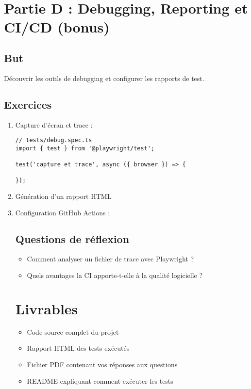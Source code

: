 \documentclass[a4paper,12pt]{article}
\begin{document}
\newpage
\section*{Partie D : Debugging, Reporting et CI/CD (bonus)}
\subsection*{But}
Découvrir les outils de debugging et configurer les rapports de test.

\subsection*{Exercices}
\begin{enumerate}
\item Capture d’écran et trace :
\begin{lstlisting}
// tests/debug.spec.ts
import { test } from '@playwright/test';

test('capture et trace', async ({ browser }) => {
  
});
\end{lstlisting}

\item Génération d’un rapport HTML

\item Configuration GitHub Actions :

\subsection*{Questions de réflexion}
\begin{itemize}
\item Comment analyser un fichier de trace avec Playwright ?
\item Quels avantages la CI apporte-t-elle à la qualité logicielle ?
\end{itemize}

\section*{Livrables}
\begin{itemize}
\item Code source complet du projet
\item Rapport HTML des tests exécutés
\item Fichier PDF contenant vos réponses aux questions
\item README expliquant comment exécuter les tests
\end{itemize}


\end{enumerate}
\end{document}
